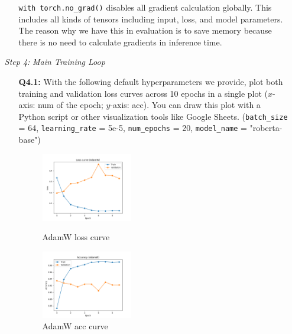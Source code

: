 \documentclass{article}
\newenvironment{solution}{\color{blue}}{}
\begin{document}
\begin{itemize}
\begin{itemize}
    \begin{solution}
      \texttt{with torch.no\_grad()} disables all gradient calculation globally. This includes all kinds of tensors including input, loss, and model parameters. The reason why we have this in evaluation is to save memory because there is no need to calculate gradients in inference time.
    \end{solution}
  \end{itemize}

  
  \item[\textit{Step 4:}] \textit{Main Training Loop}

  \begin{itemize}
    \item[\textbf{Q4.1:}] With the following default hyperparameters we provide, plot both training and validation loss curves across 10 epochs in a single plot ($x$-axis: num of the epoch; $y$-axis: acc). You can draw this plot with a Python script or other visualization tools like Google Sheets. (\texttt{batch\_size} = 64, \texttt{learning\_rate} = 5e-5, \texttt{num\_epochs} = 20, \texttt{model\_name} = "roberta-base")
    
    \begin{figure}[!htbp]
      \centering
      \begin{subcaptiongroup}
        \centering
        \parbox[b]{.4\textwidth}{%
        \centering
        \includegraphics[width=0.4\textwidth]{loss_curve_epoch_10_AdamW.png}
        \caption{AdamW loss curve}\label{AdamW-loss-4.1}}%
        \centering
        \parbox[b]{.4\textwidth}{
        \centering
        \includegraphics[width=0.4\textwidth]{acc_curve_epoch_10_AdamW.png}
        \caption{AdamW acc curve}\label{AdamW-acc-4.1}}
      \end{subcaptiongroup}
    \end{figure}
    

\end{itemize}
\end{itemize}
\end{document}
